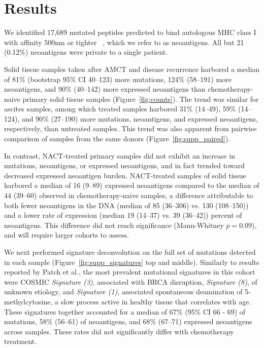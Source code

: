 \section*{Results}

We identified 17,689 mutated peptides predicted to bind autologous MHC class I with affinity 500nm or tighter ~\cite{Sette1994}, which we refer to as neoantigens. All but 21 (0.12\%) neoantigens were private to a single patient.

Solid tissue samples taken after AMCT and disease recurrence harbored a median of 81\% (bootstrap 95\% CI 40--123) more mutations, 124\% (58--191) more neoantigens, and 90\% (40--142) more expressed neoantigens than chemotherapy-naive primary solid tissue samples (Figure~\ref{fig:counts}). The trend was similar for ascites samples, among which treated samples harbored 31\% (14--49), 59\% (14--124), and 90\% (27--190) more mutations, neoantigens, and expressed neoantigens, respectively, than untreated samples. This trend was also apparent from pairwise comparison of samples from the same donors (Figure~\ref{fig:supp_paired}). 

In contrast, NACT-treated primary samples did not exhibit an increase in mutations, neoantigens, or expressed neoantigens, and in fact trended toward decreased expressed neoantigen burden. NACT-treated samples of solid tissue harbored a median of 16 (9--89) expressed neoantigens compared to the median of 44 (39--60) observed in chemotherapy-naive samples, a difference attributable to both fewer neoantigens in the DNA (median of 85 (36--306) vs. 130 (108--150)) and a lower rate of expression (median 19 (14--37) vs. 39 (36--42)) percent of neoantigens. This difference did not reach significance (Mann-Whitney $p=0.09$), and will require larger cohorts to assess.

We next performed signature deconvolution on the full set of mutations detected in each sample (Figure~\ref{fig:supp_signatures} top and middle). Similarly to results reported by Patch et al., the most prevalent mutational signatures in this cohort were COSMIC \textit{Signature (3)}, associated with BRCA disruption, \textit{Signature (8)}, of unknown etiology, and \textit{Signature (1)}, associated spontaneous deamination of 5-methylcytosine, a slow process active in healthy tissue that correlates with age. These signatures together accounted for a median of 67\% (95\% CI 66 - 69) of mutations, 58\% (56--61) of neoantigens, and 68\% (67--71) expressed neoantigens across samples. These rates did not significantly differ with chemotherapy treatment.

